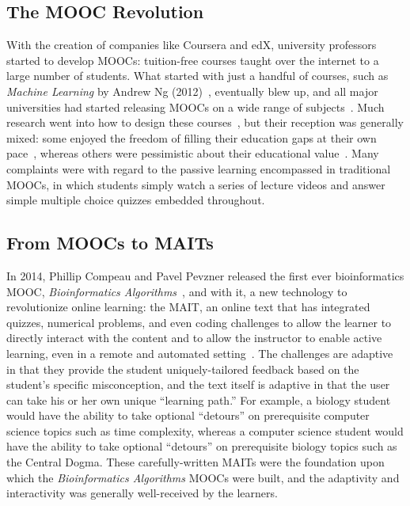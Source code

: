 \subsection{The MOOC Revolution}
With the creation of companies like Coursera and edX, university professors started to develop \glspl{MOOC}: tuition-free courses taught over the internet to a large number of students. What started with just a handful of courses, such as \textit{Machine Learning} by Andrew Ng (2012)~\cite{Ng2012}, eventually blew up, and all major universities had started releasing \glspl{MOOC} on a wide range of subjects~\cite{Pappano2012}. Much research went into how to design these courses~\cite{Guardia2013,Bruff2013,Breslow2013,Guo2014}, but their reception was generally mixed: some enjoyed the freedom of filling their education gaps at their own pace~\cite{Milligan2017}, whereas others were pessimistic about their educational value~\cite{Vardi2012}. Many complaints were with regard to the passive learning encompassed in traditional \glspl{MOOC}, in which students simply watch a series of lecture videos and answer simple multiple choice quizzes embedded throughout.

\subsection{From MOOCs to MAITs}
In 2014, Phillip Compeau and Pavel Pevzner released the first ever bioinformatics \gls{MOOC}, \textit{Bioinformatics Algorithms}~\cite{Compeau2014}, and with it, a new technology to revolutionize online learning: the \gls{MAIT}, an online text that has integrated quizzes, numerical problems, and even coding challenges to allow the learner to directly interact with the content and to allow the instructor to enable active learning, even in a remote and automated setting~\cite{Compeau2015}. The challenges are adaptive in that they provide the student uniquely-tailored feedback based on the student's specific misconception, and the text itself is adaptive in that the user can take his or her own unique ``learning path.'' For example, a biology student would have the ability to take optional ``detours'' on prerequisite computer science topics such as time complexity, whereas a computer science student would have the ability to take optional ``detours'' on prerequisite biology topics such as the Central Dogma. These carefully-written \glspl{MAIT} were the foundation upon which the \textit{Bioinformatics Algorithms} \glspl{MOOC} were built, and the adaptivity and interactivity was generally well-received by the learners.


